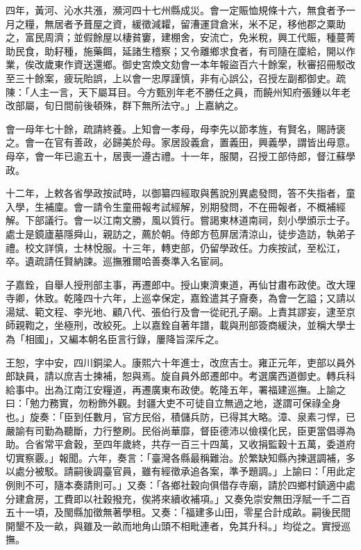 \begin{pinyinscope}
四年，黃河、沁水共漲，瀕河四十七州縣成災。會一定賑恤規條十六，無食者予一月之糧，無居者予葺屋之資，緩徵減糶，留漕運貸倉米，米不足，移他郡之粟助之，富民周濟；並假餘屋以棲貧窶，建棚舍，安流亡，免米稅，興工代賑，種蔓菁助民食，助耔種，施藥餌，延諸生稽察；又令離鄉求食者，有司隨在廩給，開以作業，俟改歲東作資送還鄉。御史宮煥文劾會一本年報盜百六十餘案，秋審招冊駁改至三十餘案，疲玩貽誤，上以會一忠厚謹慎，非有心誤公，召授左副都御史。疏陳：「人主一言，天下屬耳目。今方甄別年老不勝任之員，而饒州知府張鍾以年老改部屬，旬日間前後頓殊，群下無所法守。」上嘉納之。

會一母年七十餘，疏請終養。上知會一孝母，母李先以節孝旌，有賢名，賜詩褒之。會一在官有善政，必歸美於母。家居設義倉，置義田，興義學，謂皆出母意。母卒，會一年已逾五十，居喪一遵古禮。十一年，服闋，召授工部侍郎，督江蘇學政。

十二年，上敕各省學政按試時，以御纂四經取與舊說別異處發問，答不失指者，童入學，生補廩。會一請令生童冊報考試經解，別期發問，不在冊報者，不概補經解。下部議行。會一以江南文勝，風以質行。嘗謁東林道南祠，刻小學頒示士子。處士是鏡廬墓隱舜山，親訪之，薦於朝。侍郎方苞屏居清涼山，徒步造訪，執弟子禮。校文詳慎，士林悅服。十三年，轉吏部，仍留學政任。力疾按試，至松江，卒。遺疏請任賢納諫。巡撫雅爾哈善奏準入名宦祠。

子嘉銓，自舉人授刑部主事，再遷郎中。授山東濟東道，再仙甘肅布政使。改大理寺卿，休致。乾隆四十六年，上巡幸保定，嘉銓遣其子齎奏，為會一乞謚；又請以湯斌、範文程、李光地、顧八代、張伯行及會一從祀孔子廟。上責其謬妄，逮至京師親鞫之，坐極刑，改絞死。上以嘉銓自著年譜，載與刑部簽商緩決，並稱大學士為「相國」，又編本朝名臣言行錄，屢降旨深斥之。

王恕，字中安，四川銅梁人。康熙六十年進士，改庶吉士。雍正元年，吏部以員外郎缺員，請以庶吉士揀補，恕與焉。旋自員外郎遷郎中。考選廣西道御史。轉兵科給事中。出為江南江安糧道，再遷廣東布政使。乾隆五年，署福建巡撫。上諭之曰：「勉力務實，勿粉飾外觀。封疆大吏不可徒自立無過之地，遂謂可保祿全身也。」旋奏：「臣到任數月，官方民俗，積儲兵防，已得其大略。漳、泉素刁悍，已嚴諭有司勤為聽斷，力行整刷。民俗尚華靡，督臣德沛以儉樸化民，臣更當倡導為助。合省常平倉穀，至四年歲終，共存一百三十四萬，又收捐監穀十五萬，委道府切實察覈。」報聞。六年，奏言：「臺灣各縣最稱難治。於繁缺知縣內揀選調補，多以處分被駁。請嗣後調臺官員，雖有經徵承追各案，準予題調。」上諭曰：「用此定例則不可，隨本奏請則可。」又奏：「各鄉社穀向俱借存寺廟，請於四鄉村鎮適中處分建倉房，工費即以社穀撥充，俟將來續收補項。」又奏免崇安無田浮賦一千二百五十一頃，及閩縣加徵無著學租。又奏：「福建多山田，零星合計成畝。嗣後民間開墾不及一畝，與雖及一畝而地角山頭不相毗連者，免其升科。」均從之。實授巡撫。


\end{pinyinscope}

